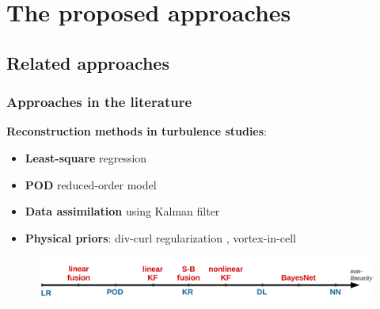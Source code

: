 \documentclass{beamer}
\let\olditem\item
\renewcommand{\item}{\setlength{\itemsep}{\fill}\olditem}
\begin{document}

\section[Approaches]{The proposed approaches}
\subsection[Related approaches]{Related approaches}
\begin{frame}
\frametitle{Approaches in the literature}
	\begin{block}{\textbf{Reconstruction methods in turbulence studies}:}
		\begin{itemize}
			\item \textbf{Least-square} regression {\footnotesize \cite{durgesh2010multi}}
			\item \textbf{POD} reduced-order model {\footnotesize \cite{bonnet1994stochastic}}
			\item \textbf{Data assimilation} using Kalman filter {\footnotesize \cite{papadakis2010data,tu2013integration}}
			\item \textbf{Physical priors}: div-curl regularization {\footnotesize\cite{corpetti2002dense}}, vortex-in-cell {\footnotesize \cite{schneiders2014time}}
		\end{itemize}
	\end{block}
	\vfill
	\pause
	\begin{figure}
		\includegraphics[width=\textwidth]{./figures/turbulence/models_spectrum.pdf}
	\end{figure}	
			
\end{frame}
\end{document}
